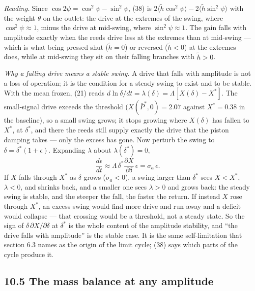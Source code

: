 \documentclass[11pt]{article}
\begin{document}
\emph{Reading.} Since $\cos 2\psi = \cos^2\psi - \sin^2\psi$, (38) is $2\langle\tilde h\cos^2\psi\rangle - 2\langle\tilde h\sin^2\psi\rangle$ with the weight $\theta$ on the outlet: the drive at the extremes of the swing, where $\cos^2\psi \approx 1$, minus the drive at mid-swing, where $\sin^2\psi \approx 1$. The gain falls with amplitude exactly when the reeds drive less at the extremes than at mid-swing --- which is what being pressed shut ($\tilde h = 0$) or reversed ($\tilde h < 0$) at the extremes does, while at mid-swing they sit on their falling branches with $\tilde h > 0$.

\emph{Why a falling drive means a stable swing.} A drive that falls with amplitude is not a loss of operation; it is the condition for a steady swing to exist and to be stable. With the mean frozen, (21) reads $d\ln\delta/dt = \lambda(\delta) = \Lambda[X(\delta) - X^*]$. The small-signal drive exceeds the threshold ($X(\bar P^*, 0) = 2.07$ against $X^* = 0.38$ in the baseline), so a small swing grows; it stops growing where $X(\delta)$ has fallen to $X^*$, at $\delta^*$, and there the reeds still supply exactly the drive that the piston damping takes --- only the excess has gone. Now perturb the swing to $\delta = \delta^*(1 + \epsilon)$. Expanding $\lambda$ about $\lambda(\delta^*) = 0$,
\[
\frac{d\epsilon}{dt} \approx \Lambda\,\delta^*\frac{\partial X}{\partial\delta}\,\epsilon = \sigma_a\,\epsilon .
\]
If $X$ falls through $X^*$ as $\delta$ grows ($\sigma_a < 0$), a swing larger than $\delta^*$ sees $X < X^*$, $\lambda < 0$, and shrinks back, and a smaller one sees $\lambda > 0$ and grows back: the steady swing is stable, and the steeper the fall, the faster the return. If instead $X$ rose through $X^*$, an excess swing would find more drive and run away and a deficit would collapse --- that crossing would be a threshold, not a steady state. So the sign of $\delta\,\partial X/\partial\delta$ at $\delta^*$ is the whole content of the amplitude stability, and ``the drive falls with amplitude'' is the stable case. It is the same self-limitation that section 6.3 names as the origin of the limit cycle; (38) says which parts of the cycle produce it.

\subsection*{10.5 The mass balance at any amplitude}
\end{document}
